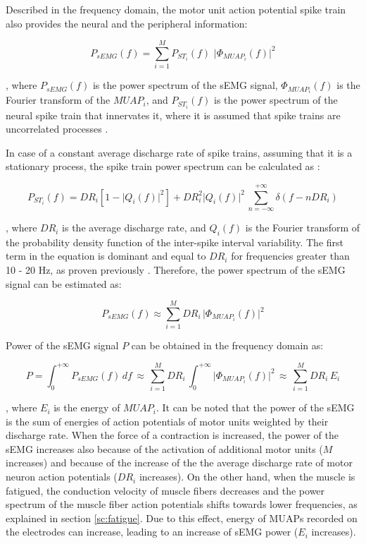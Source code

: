 Described in the frequency domain, the motor unit action potential spike train also provides the neural and the peripheral information:

\begin{equation}
P_{sEMG}(f) = \sum_{i=1}^{M} P_{ST_i}(f) \, \, \big\vert \Phi_{MUAP_i}(f) \big\vert^2
\end{equation}

, where $P_{sEMG}(f)$ is the power spectrum of the sEMG signal, $\Phi_{MUAP_i}(f)$ is the Fourier transform of the $MUAP_i$, and $P_{ST_i}(f)$ is the power spectrum of the neural spike train that innervates it, where it is assumed that spike trains are uncorrelated processes \citep{Farina2014}.

In case of a constant average discharge rate of spike trains, assuming that it is a stationary process, the spike train power spectrum can be calculated as \citep{Farina2014}:

\begin{equation}
P_{ST_i}(f) = DR_i \left[ 1- \big\vert Q_i(f)\big\vert^2 \right] + DR_i^2  \big\vert Q_i(f)\big\vert^2 \,  \sum_{n=-\infty}^{+\infty} \delta(f - n DR_i)
\end{equation}

, where $DR_i$ is the average discharge rate, and $Q_i(f)$ is the Fourier transform of the probability density function of the inter-spike interval variability. The first term in the equation is dominant and equal to $DR_i$ for frequencies greater than 10 - 20 Hz, as proven previously \citep{Lago1977, Farina2014}. Therefore, the power spectrum of the sEMG signal can be estimated as:

\begin{equation}
P_{sEMG}(f) \approx  \sum_{i=1}^{M} DR_i \, \big\vert \Phi_{MUAP_i}(f) \big\vert^2
\end{equation}

Power of the sEMG signal $P$ can be obtained in the frequency domain as:

\begin{equation}
P = \int_0^{+\infty} P_{sEMG}(f)  \, df  \, \approx \, \sum_{i=1}^{M} DR_i \, \int_0^{+\infty} \big\vert \Phi_{MUAP_i}(f) \big\vert^2 \, \approx \, \sum_{i=1}^{M} DR_i \,E_i
\end{equation}

, where $E_i$ is the energy of $MUAP_i$. It can be noted that the power of the sEMG is the sum of energies of action potentials of motor units weighted by their discharge rate. When the force of a contraction is increased, the power of the sEMG increases also because of the activation of additional motor units ($M$ increases) and because of the increase of the the average discharge rate of motor neuron action potentials ($DR_i$ increases). On the other hand, when the muscle is fatigued, the conduction velocity of muscle fibers decreases and the power spectrum of the muscle fiber action potentials shifts towards lower frequencies, as explained in section \ref{sc:fatigue}. Due to this effect, energy of MUAPs recorded on the electrodes can increase, leading to an increase of sEMG power ($E_i$ increases).

